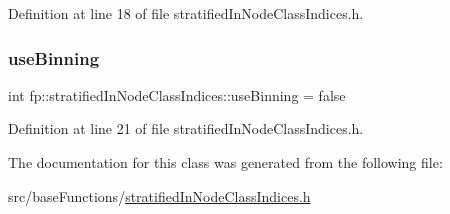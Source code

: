Definition at line 18 of file stratified\+In\+Node\+Class\+Indices.\+h.

\mbox{\label{classfp_1_1stratifiedInNodeClassIndices_af6ca8b8a4539b8c35008cce88961fa00}} 
\subsubsection{\texorpdfstring{use\+Binning}{useBinning}}
{\footnotesize\ttfamily int fp\+::stratified\+In\+Node\+Class\+Indices\+::use\+Binning = false\hspace{0.3cm}{\ttfamily [private]}}



Definition at line 21 of file stratified\+In\+Node\+Class\+Indices.\+h.



The documentation for this class was generated from the following file\+:\begin{DoxyCompactItemize}
\item 
src/base\+Functions/\hyperlink{stratifiedInNodeClassIndices_8h}{stratified\+In\+Node\+Class\+Indices.\+h}\end{DoxyCompactItemize}

